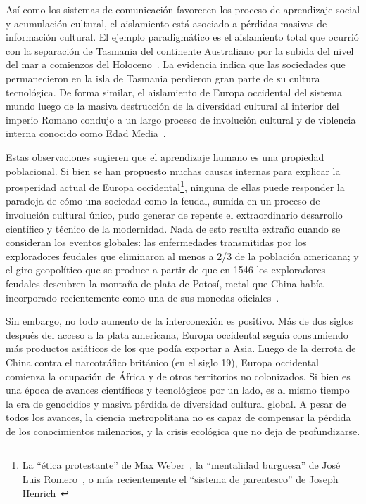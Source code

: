 \documentclass[a4paper,11pt]{book}
\theoremstyle{definition}
\begin{document}

As\'i como los sistemas de comunicaci\'on favorecen los proceso de aprendizaje social y acumulaci\'on cultural, el aislamiento est\'a asociado a p\'erdidas masivas de informaci\'on cultural.
%
El ejemplo paradigm\'atico es el aislamiento total que ocurri\'o con la separaci\'on de Tasmania del continente Australiano por la subida del nivel del mar a comienzos del Holoceno~\cite{Henrich2004}.
%
La evidencia indica que las sociedades que permanecieron en la isla de Tasmania perdieron gran parte de su cultura tecnol\'ogica.
%
De forma similar, el aislamiento de Europa occidental del sistema mundo luego de la masiva destrucci\'on de la diversidad cultural al interior del imperio Romano condujo a un largo proceso de involuci\'on cultural y de violencia interna conocido como Edad Media~\cite{dussel2004}.


Estas observaciones sugieren que el aprendizaje humano es una propiedad poblacional.
%
Si bien se han propuesto muchas causas internas para explicar la prosperidad actual de Europa occidental\footnote{La ``\'etica protestante'' de Max Weber~\cite{weber1905-eticaProtestante}, la ``mentalidad burguesa'' de Jos\'e Luis Romero~\cite{romero1967-revolucionBurguesa}, o m\'as recientemente el ``sistema de parentesco'' de Joseph Henrich~\cite{henrich2020-weirdest}}, ninguna de ellas puede responder la paradoja de c\'omo una sociedad como la feudal, sumida en un proceso de involuci\'on cultural \'unico, pudo generar de repente el extraordinario desarrollo cient\'ifico y t\'ecnico de la modernidad.
%
Nada de esto resulta extra\~no cuando se consideran los eventos globales: las enfermedades transmitidas por los exploradores feudales que eliminaron al menos a 2/3 de la poblaci\'on americana; y el giro geopol\'itico que se produce a partir de que en 1546 los exploradores feudales descubren la monta\~na de plata de Potos\'i, metal que China hab\'ia incorporado recientemente como una de sus monedas oficiales~\cite{dussel2017}.


Sin embargo, no todo aumento de la interconexi\'on es positivo.
%
M\'as de dos siglos despu\'es del acceso a la plata americana, Europa occidental segu\'ia consumiendo m\'as productos asi\'aticos de los que pod\'ia exportar a Asia.
%
Luego de la derrota de China contra el narcotr\'afico brit\'anico (en el siglo 19), Europa occidental comienza la ocupaci\'on de \'Africa y de otros territorios no colonizados.
%
Si bien es una \'epoca de avances cient\'ificos y tecnol\'ogicos por un lado, es al mismo tiempo la era de genocidios y masiva p\'erdida de diversidad cultural global.
%
A pesar de todos los avances, la ciencia metropolitana no es capaz de compensar la p\'erdida de los conocimientos milenarios, y la crisis ecol\'ogica que no deja de profundizarse.
\end{document}
